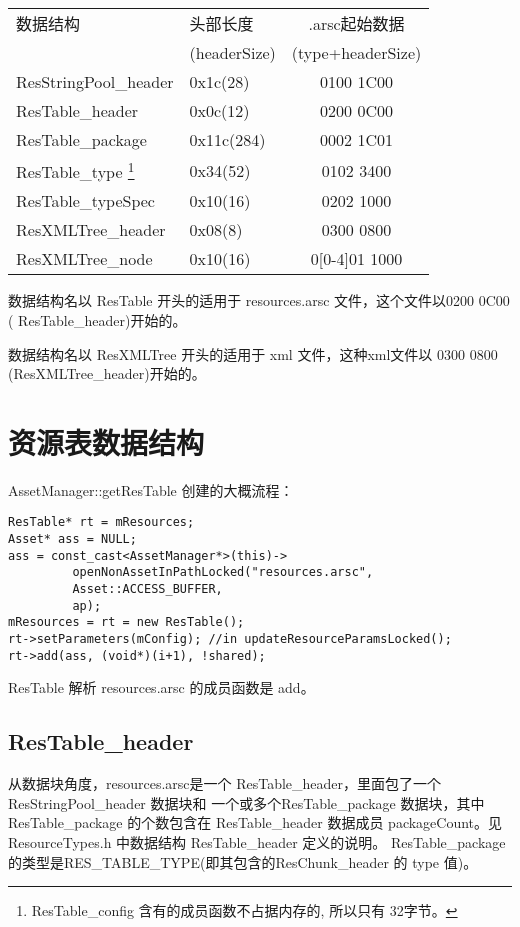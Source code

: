 \documentclass[a4paper,11pt]{article}
\begin{document}
\begin{minipage}{\linewidth}
\begin{tabular}{|llc|}\hline
    数据结构 & 头部长度 & .arsc起始数据\\
             & (headerSize) & (type+headerSize)\\\hline
  ResStringPool_header & 0x1c(28) & 0100 1C00 \\\hline
  ResTable_header & 0x0c(12) & 0200 0C00 \\
  ResTable_package & 0x11c(284) & 0002 1C01 \\
  ResTable_type \footnote{ResTable_config 含有的成员函数不占据内存的, 所以只有
  32字节。}
  & 0x34(52) & 0102 3400\\
  ResTable_typeSpec & 0x10(16) & 0202 1000\\ \hline
  ResXMLTree_header & 0x08(8)& 0300 0800 \\ 
  ResXMLTree_node & 0x10(16)& 0[0-4]01 1000\\
  \hline
\end{tabular}
\end{minipage}

数据结构名以 ResTable 开头的适用于 resources.arsc 文件，这个文件以0200 0C00 (
ResTable_header)开始的。

数据结构名以 ResXMLTree 开头的适用于 xml 文件，这种xml文件以 0300 0800
(ResXMLTree_header)开始的。

\section{资源表数据结构}
AssetManager::getResTable 创建的大概流程：
\begin{lstlisting}
ResTable* rt = mResources;
Asset* ass = NULL;
ass = const_cast<AssetManager*>(this)->
         openNonAssetInPathLocked("resources.arsc",
         Asset::ACCESS_BUFFER,
         ap);
mResources = rt = new ResTable();
rt->setParameters(mConfig); //in updateResourceParamsLocked();
rt->add(ass, (void*)(i+1), !shared);
\end{lstlisting}
ResTable 解析 resources.arsc 的成员函数是 add。

\subsection{ResTable_header}
从数据块角度，resources.arsc是一个 ResTable_header，里面包了一个 ResStringPool_header 数据块和
一个或多个ResTable_package 数据块，其中 ResTable_package 的个数包含在 ResTable_header
数据成员 packageCount。见ResourceTypes.h 中数据结构 ResTable_header 定义的说明。
ResTable_package的类型是RES_TABLE_TYPE(即其包含的ResChunk_header 的 type 值)。
\end{document}
